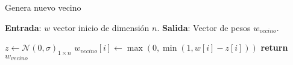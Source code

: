   \begin{algorithm}
    \caption{Genera nuevo vecino}
    \hspace*{\algorithmicindent} 

        \textbf{Entrada}: $w$ vector inicio de dimensión $n$. 
        \hspace*{\algorithmicindent} 
        \textbf{Salida}:
        Vector de pesos $w_{vecino}$.        
    \begin{algorithmic}[1]
          \State $z \gets \mathcal{N}(0, \sigma)_{1 \times n}$
          \State $w_{vecino}[i] \gets \max(0, \min(1, w[i]-z[i]))$
        \EndFor
        \State \textbf{return} $w_{vecino}$
      \EndProcedure
    \end{algorithmic}
  \end{algorithm}



